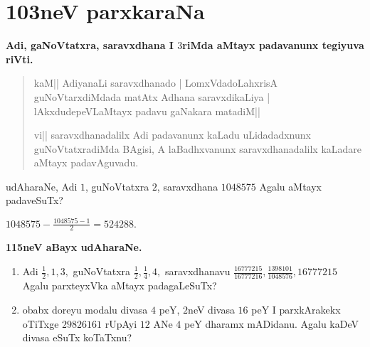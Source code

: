 \chapter{103neV parxkaraNa}

\begin{center}
{\bf Adi, gaNoVtatxra, saravxdhana I $3$riMda aMtayx padavanunx tegiyuva riVti.}
\end{center}

\begin{verse}
kaM|| AdiyanaLi saravxdhanado | LomxVdadoLahxrisA guNoVtarxdiMdada matAtx Adhana saravxdikaLiya | lAkxdudepeVLaMtayx padavu gaNakara matadiM||

vi|| saravxdhanadalilx Adi padavanunx kaLadu uLidadadxnunx guNoVtatxradiMda BAgisi, A laBadhxvanunx saravx\-dhanadalilx kaLadare aMtayx padavAguvadu.
\end{verse}

udAharaNe, Adi $1$, guNoVtatxra $2$, saravxdhana $1048575$ Agalu aMtayx padaveSuTx?

\qq $1048575-\tfrac{1048575-1}{2}=524288.$

\begin{center}
{\bf\large 115neV aBayx udAharaNe.}
\end{center}

\begin{enumerate}[\rm(1)]
\item Adi $\tfrac{1}{2}, 1, 3,$ guNoVtatxra $\tfrac{1}{2}, \tfrac{1}{4}, 4,$ saravxdhanavu $\tfrac{16777215}{16777216}, \tfrac{1398101}{1048576}, 16777215$ Agalu parxteyxVka aMtayx padagaLeSuTx?

\item obabx doreyu modalu divasa $4$ peY, $2$neV divasa $16$ peY  I parxkArakekx oTiTxge $29826161$ rUpAyi $12$ ANe $4$ peY dharamx mADidanu. Agalu kaDeV divasa eSuTx koTaTxnu?
\end{enumerate}
